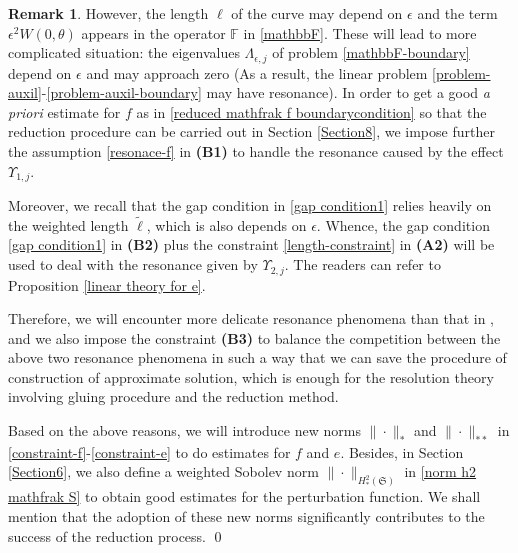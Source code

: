 \documentclass[10pt, reqno]{amsart}
\numberwithin{equation}{section}
\theoremstyle{definition}
\newtheorem{remark}[theorem]{Remark}
\begin{document}
{\begin{remark}
{\smallskip
However, the length $\ell$ of the curve may depend on $\epsilon$ and the term $\epsilon^2 W(0,\theta)$ appears in the operator ${\mathbb F}$ in \eqref{mathbbF}.
These will lead to more complicated situation: the eigenvalues $\Lambda_{\epsilon, j}$ of problem \eqref{mathbbF-boundary} depend on $\epsilon$ and may approach zero
(As a result, the linear problem \eqref{problem-auxil}-\eqref{problem-auxil-boundary} may have resonance).
In order to get a good {\em a priori} estimate for $f$ as in \eqref{reduced mathfrak f boundarycondition} so that the reduction procedure
can be carried out in Section \ref{Section8}, we impose further the assumption \eqref{resonace-f} in {\bf{(B1)}} to handle the resonance caused by the effect $\Upsilon_{1,j}$.

\smallskip
Moreover, we recall that the gap condition in \eqref{gap condition1} relies heavily on the weighted length ${\tilde\ell}$, which is also depends on $\epsilon$.
Whence, the gap condition \eqref{gap condition1} in {\bf{(B2)}} plus the constraint \eqref{length-constraint} in {\bf{(A2)}} will be used to deal with the resonance given by $\Upsilon_{2,j}$.
The readers can refer to Proposition \ref{linear theory for e}.

\smallskip
Therefore, we will encounter more delicate resonance phenomena than that in \cite{delPKowWei1},
and we also impose the constraint {\bf{(B3)}} to balance the competition between the above two resonance phenomena
in such a way that we can save the procedure of construction of approximate solution, which is enough for the resolution theory involving gluing procedure and the reduction method.

\smallskip
Based on the above reasons, we will introduce new norms $\|\cdot\|_*$ and $\|\cdot\|_{**}$ in \eqref{constraint-f}-\eqref{constraint-e} to do estimates for $f$ and $e$.
Besides, in Section \ref{Section6}, we also define a weighted Sobolev norm $\|\cdot\|_{H^2_*(\mathfrak S)} $ in \eqref{norm h2 mathfrak S} to obtain good estimates for the perturbation function.
We shall mention that the adoption of these new norms significantly contributes to the success of the reduction process.
\qed
}
\end{remark}



}
\end{document}
